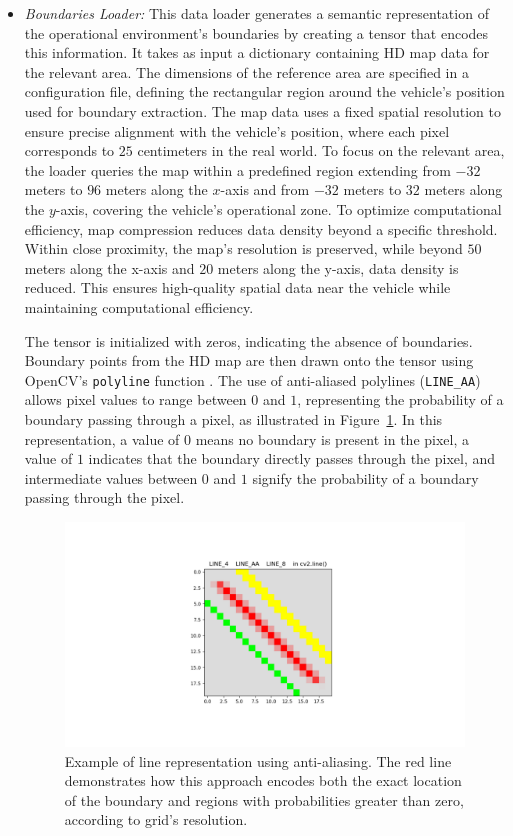 \begin{itemize}
    \item \textit{Boundaries Loader:} This data loader generates a semantic representation of the operational environment's boundaries by creating a tensor that encodes this information. It takes as input a dictionary containing HD map data for the relevant area. The dimensions of the reference area are specified in a configuration file, defining the rectangular region around the vehicle's position used for boundary extraction.
    The map data uses a fixed spatial resolution to ensure precise alignment with the vehicle’s position, where each pixel corresponds to $25$ centimeters in the real world. To focus on the relevant area, the loader queries the map within a predefined region extending from $-32$ meters to $96$ meters along the $x$-axis and from $-32$ meters to $32$ meters along the $y$-axis, covering the vehicle’s operational zone. 
    To optimize computational efficiency, map compression reduces data density beyond a specific threshold. Within close proximity, the map’s resolution is preserved, while beyond $50$ meters along the x-axis and $20$ meters along the y-axis, data density is reduced. This ensures high-quality spatial data near the vehicle while maintaining computational efficiency.

    The tensor is initialized with zeros, indicating the absence of boundaries. Boundary points from the HD map are then drawn onto the tensor using OpenCV's \texttt{polyline} function \cite{itseez2015opencv}. The use of anti-aliased polylines (\texttt{LINE\_AA}) allows pixel values to range between $0$ and $1$, representing the probability of a boundary passing through a pixel, as illustrated in Figure~\ref{fig:polylines}. In this representation, a value of $0$ means no boundary is present in the pixel, a value of $1$ indicates that the boundary directly passes through the pixel, and intermediate values between $0$ and $1$ signify the probability of a boundary passing through the pixel.
    
    \begin{minipage}{\linewidth}
    \begin{figure}[H]
        \centering
        \includegraphics[width=0.4\linewidth]{LateX//figs/polyline.pdf}
        \caption{Example of line representation using anti-aliasing. The red line demonstrates how this approach encodes both the exact location of the boundary and regions with probabilities greater than zero, according to grid's resolution.}
        \label{fig:polylines}
    \end{figure}
    \end{minipage}
    \vspace{0.25 cm}


\end{itemize}
